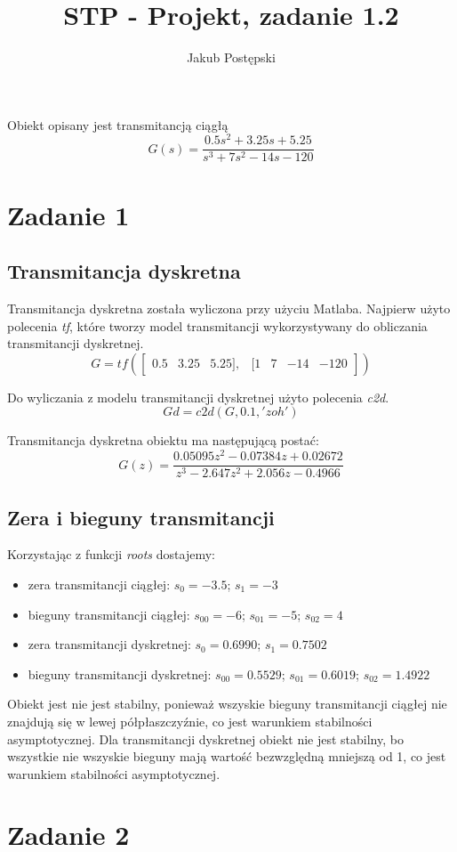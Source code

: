 \documentclass{article}
\author{Jakub Postępski}
\title{STP - Projekt, zadanie 1.2}
\begin{document}
\maketitle

Obiekt opisany jest transmitancją ciągłą
\[ G(s) = \frac{0.5s^2 +3.25s+5.25}{s^3 +7s^2 -14s-120} \]
\section{Zadanie 1}
\subsection{Transmitancja dyskretna}
Transmitancja dyskretna została wyliczona przy użyciu Matlaba.
Najpierw użyto polecenia \textit{tf}, które tworzy model transmitancji wykorzystywany do obliczania transmitancji dyskretnej. 
\[G = tf(\begin{bmatrix}0.5& 3.25& 5.25],&[1& 7& -14& -120\end{bmatrix})\]

Do wyliczania z modelu transmitancji dyskretnej użyto polecenia \textit{c2d}.
\[Gd = c2d(G,0.1,'zoh')\]

Transmitancja dyskretna obiektu ma następującą postać:
\[ G(z) = \frac{0.05095 z^2 - 0.07384 z + 0.02672}{z^3 - 2.647 z^2 + 2.056 z - 0.4966} \]

\subsection{Zera i bieguny transmitancji}
Korzystając z funkcji \textit{roots} dostajemy:
\begin{itemize}
\item zera transmitancji ciągłej: $s_0=-3.5$; $s_1=-3$
\item bieguny transmitancji ciągłej: $s_{00}=-6$; $s_{01}=-5$; $s_{02}=4$
\item zera transmitancji dyskretnej: $s_0=0.6990$; $s_1=0.7502$
\item bieguny transmitancji dyskretnej: $s_{00}=0.5529$; $s_{01}=0.6019$; $s_{02}=1.4922$
\end{itemize}
Obiekt jest nie jest stabilny, ponieważ wszyskie bieguny transmitancji ciągłej nie znajdują się w lewej półpłaszczyźnie, co jest warunkiem stabilności asymptotycznej. Dla transmitancji dyskretnej obiekt nie jest stabilny, bo wszystkie nie wszyskie bieguny mają wartość bezwzględną mniejszą od 1, co jest warunkiem stabilności asymptotycznej.
\section{Zadanie 2}
\end{document}
